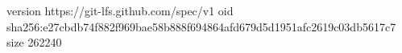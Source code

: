 version https://git-lfs.github.com/spec/v1
oid sha256:e27cbdb74f882f969bae58b888f694864afd679d5d1951afc2619c03db5617c7
size 262240
